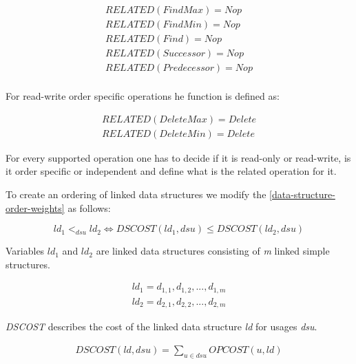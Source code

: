 \documentclass[a4paper,11pt]{article}
\begin{document}
			\begin{eqnarray}
                \mathit{RELATED}(FindMax) = Nop\\
                \mathit{RELATED}(FindMin) = Nop\\
                \mathit{RELATED}(Find) = Nop\\
                \mathit{RELATED}(Successor) = Nop\\
                \mathit{RELATED}(Predecessor) = Nop\\
            \end{eqnarray}

			For read-write order specific operations he function is defined as:

			\begin{eqnarray}
                \mathit{RELATED}(DeleteMax) = Delete\\
                \mathit{RELATED}(DeleteMin) = Delete
            \end{eqnarray}

            For every supported operation one has to decide if it is read-only or read-write, is it order specific or independent and define what is the related operation for it.

            To create an ordering of linked data structures we modify the \autoref{data-structure-order-weights} as follows:

            \begin{equation} \label{data-structure-order-different-types}
                ld_1 <_{dsu} ld_2 \Leftrightarrow \mathit{DSCOST}(ld_1, dsu) \leq \mathit{DSCOST}(ld_2, dsu) 
            \end{equation}

            Variables $ld_1$ and $ld_2$ are linked data structures consisting of \emph{m} linked simple structures.

            \begin{eqnarray}
            	ld_1 = d_{1,1}, d_{1,2}, ..., d_{1,m}\\            
            	ld_2 = d_{2,1}, d_{2,2}, ..., d_{2,m}
            \end{eqnarray}

            \emph{DSCOST} describes the cost of the linked data structure \emph{ld} for usages \emph{dsu}.

            \begin{eqnarray}
                \mathit{DSCOST}(ld,dsu) = \sum_{u \in dsu} \mathit{OPCOST}(u, ld)
            \end{eqnarray}
\end{document}
